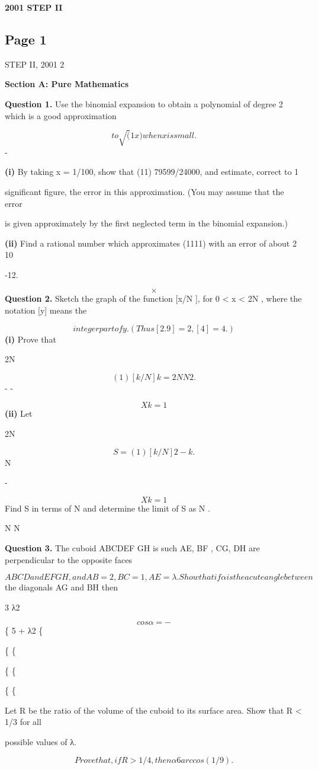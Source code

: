 \documentclass[12pt]{article}
\begin{document}
\begin{center}
{\Large \textbf{2001 STEP II}}
\end{center}

\subsection*{Page 1}
\begin{flushleft}
STEP II, 2001 2\par
\bigskip\textbf{Section A: Pure Mathematics}\par
\bigskip\textbf{Question 1.} Use the binomial expansion to obtain a polynomial of degree 2 which is a good approximation\par
\[to \sqrt(1 x) when x is small.\]
-\par
\textbf{(i)} By taking x = 1/100, show that \sqrt(11) 79599/24000, and estimate, correct to 1\par
\approx\par
significant figure, the error in this approximation. (You may assume that the error\par
is given approximately by the first neglected term in the binomial expansion.)\par
\textbf{(ii)} Find a rational number which approximates \sqrt(1111) with an error of about 2 10\par
-12.\par
\[\times\]
\bigskip\textbf{Question 2.} Sketch the graph of the function [x/N ], for 0 < x < 2N , where the notation [y] means the\par
\[integer part of y. (Thus [2.9] = 2, [4] = 4.)\]
\textbf{(i)} Prove that\par
2N\par
\[( 1)[k/N]k = 2N N 2.\]
- -\par
\[Xk=1\]
\textbf{(ii)} Let\par
2N\par
\[S = ( 1)[k/N]2 -k.\]
N\par
-\par
\[Xk=1\]
Find S in terms of N and determine the limit of S as N .\par
N N\par
\to \infty\par
\bigskip\textbf{Question 3.} The cuboid ABCDEF GH is such AE, BF , CG, DH are perpendicular to the opposite faces\par
\[ABCD and EF GH, and AB = 2, BC = 1, AE = λ. Show that if α is the acute angle between\]
the diagonals AG and BH then\par
3 λ2\par
\[cos α = -\]
\{ 5 + λ2 \{\par
\{ \{\par
\{ \{\par
\{ \{\par
Let R be the ratio of the volume of the cuboid to its surface area. Show that R < 1/3 for all\par
possible values of λ.\par
\[Prove that, if R > 1/4, then α 6 arccos(1/9).\]
\end{flushleft}
\end{document}
